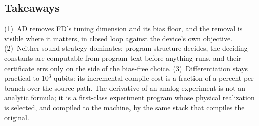 \subsection{Takeaways}
\label{sec:eval-takeaways}

(1)~AD removes FD's tuning dimension and its bias floor, and the removal
is visible where it matters, in closed loop against the device's own
objective. (2)~Neither sound strategy dominates: program structure decides,
the deciding constants are computable from program text before anything
runs, and their certificate errs only on the side of the bias-free choice.
(3)~Differentiation stays practical to $10^{3}$ qubits: its incremental
compile cost is a fraction of a percent per branch over the source path.
The derivative of an analog experiment is not an analytic formula; it is a
first-class experiment program whose physical realization is selected, and
compiled to the machine, by the same stack that compiles the original.
